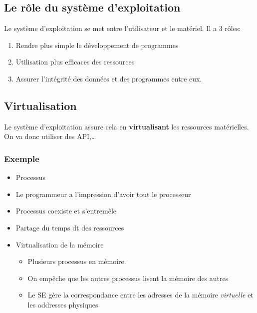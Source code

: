 \subsection{Le rôle du système
d'exploitation}\label{le-ruxf4le-du-systuxe8me-dexploitation}

Le système d'exploitation se met entre l'utilisateur et le matériel. Il
a 3 rôles:

\begin{enumerate}
\def\labelenumi{\arabic{enumi}.}
\tightlist
\item
  Rendre plus simple le développement de programmes
\item
  Utilisation plus efficaces des ressources
\item
  Assurer l'intégrité des données et des programmes entre eux.
\end{enumerate}

\subsection{Virtualisation}\label{virtualisation}

Le système d'exploitation assure cela en \textbf{virtualisant} les
ressources matérielles. On va donc utiliser des API,\ldots{}

\subsubsection{Exemple}\label{exemple}

\begin{itemize}
\tightlist
\item
  Processus
\item
  Le programmeur a l'impression d'avoir tout le processeur
\item
  Processus coexiste et s'entremêle
\item
  Partage du temps dt des ressources
\item
  Virtualisation de la mémoire

  \begin{itemize}
  \tightlist
  \item
    Plusieurs processus en mémoire.
  \item
    On empêche que les autres processus lisent la mémoire des autres
  \item
    Le SE gère la correspondance entre les adresses de la mémoire
    \emph{virtuelle} et les addresses physiques
  \end{itemize}
\end{itemize}

